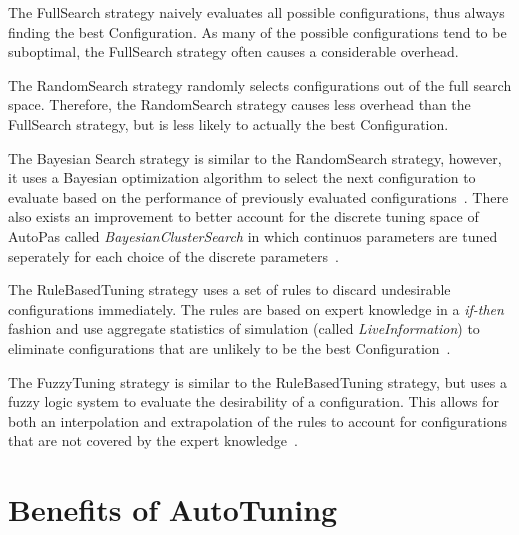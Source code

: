 \documentclass[conference]{IEEEtran}
\begin{document}
\begin{description}[style=nextline]
    \item[FullSearch]
        The FullSearch strategy naively evaluates all possible configurations, thus always finding the best Configuration. As many of the possible configurations tend to be suboptimal\cite{Manuel_Lerchner_Thesis.pdf}, the FullSearch strategy often causes a considerable overhead.

    \item[RandomSearch]
        The RandomSearch strategy randomly selects configurations out of the full search space. Therefore, the RandomSearch strategy causes less overhead than the FullSearch strategy, but is less likely to actually the best Configuration.

    \item[BayesianSearch]
        The Bayesian Search strategy is similar to the RandomSearch strategy, however, it uses a Bayesian optimization algorithm to select the next configuration to evaluate based on the performance of previously evaluated configurations~\cite{njan_master}. There also exists an improvement to better account for the discrete tuning space of AutoPas called \textit{BayesianClusterSearch} in which continuos parameters are tuned seperately for each choice of the discrete parameters~\cite{njan_master}.

    \item[RuleBasedTuning]
        The RuleBasedTuning strategy uses a set of rules to discard undesirable configurations immediately. The rules are based on expert knowledge in a \textit{if-then} fashion and use aggregate statistics of simulation (called \textit{LiveInformation}) to eliminate configurations that are unlikely to be the best Configuration~\cite{endreport.pdf}.

    \item[FuzzyTuning]
        The FuzzyTuning strategy is similar to the RuleBasedTuning strategy, but uses a fuzzy logic system to evaluate the desirability of a configuration. This allows for both an interpolation and extrapolation of the rules to account for configurations that are not covered by the expert knowledge~\cite{Manuel_Lerchner_Thesis.pdf}.

\end{description}

\section{Benefits of AutoTuning}
\end{document}
